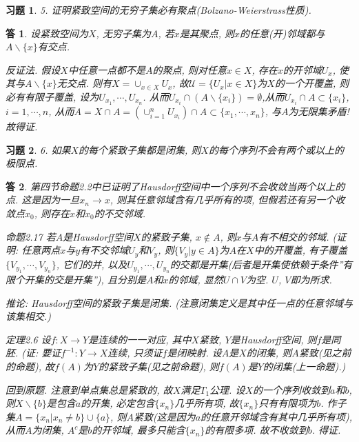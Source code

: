 \documentclass{ctexart}%
\newtheorem*{exercise}{习题}
\newtheorem*{solution}{答}
\theoremstyle{definition}
\theoremstyle{remark}
\begin{document}
\begin{exercise}5. 证明紧致空间的无穷子集必有聚点(Bolzano-Weierstrass性质). 
\end{exercise}
\begin{solution}
设紧致空间为$X$, 无穷子集为$A$, 若$x$是其聚点, 则$x$的任意(开)邻域都与$A\backslash\{x\}$有交点. 

反证法. 假设$X$中任意一点都不是$A$的聚点, 则对任意$x\in X$, 存在$x$的开邻域$U_x$, 使其与$A\backslash\{x\}$无交点. 则有$X=\cup_{x\in X}U_x$, 故$\mathscr{U}=\{U_x|x\in X\}$为$X$的一个开覆盖, 则必有有限子覆盖, 设为$U_{x_1},\cdots, U_{x_n}$. 从而$U_{x_i}\cap( A\backslash\{x_i\})=\emptyset$,从而$U_{x_i}\cap A\subset \{x_i\}$, $i=1,\cdots, n$, 从而$A=X\cap A=(\cup_{i=1}^n  U_{x_i})\cap A\subset
\{x_1,\cdots, x_n\}$, 与$A$为无限集矛盾! 故得证.
\end{solution}

\begin{exercise}6. 如果$X$的每个紧致子集都是闭集, 则$X$的每个序列不会有两个或以上的极限点.
\end{exercise}
\begin{solution}
第四节命题2.2中已证明了Hausdorff空间中一个序列不会收敛当两个以上的点. 这是因为一旦$x_n\rightarrow x$, 则其任意邻域含有几乎所有的项, 但假若还有另一个收敛点$x_0$, 则存在$x$和$x_0$的不交邻域. 

命题2.17 若$A$是Hausdorff空间$X$的紧致子集, $x\notin A$, 则$x$与$A$有不相交的邻域. (证明: 任意两点$x$与$y$有不交邻域$U_y$和$V_y$, 则$\{V_y|y\in A\}$为$A$在$X$中的开覆盖, 有子覆盖$\{V_{y_1},\cdots, V_{y_n}\}$, 它们的并, 以及$U_{y_1},\cdots, U_{y_n}$的交都是开集(后者是开集使依赖于条件''有限个开集的交是开集''), 且分别是$A$和$x$的邻域, 显然$U\cap V$为空. $U$, $V$即为所求. 

推论: Hausdorff空间的紧致子集是闭集. (注意闭集定义是其中任一点的任意邻域与该集相交.)

定理2.6 设$f:X\rightarrow Y$是连续的一一对应, 其中$X$紧致, $Y$是Hausdorff空间, 则$f$是同胚. (证: 要证$f^{-1}: Y\rightarrow X$连续, 只须证$f$是闭映射. 设$A$是$X$的闭集, 则$A$紧致(见之前的命题), 故$f(A)$为$Y$的紧致子集(见之前命题), 则$f(A)$是$Y$的闭集(上一命题).)

回到原题. 注意到单点集总是紧致的, 故$X$满足$T_1$公理. 设$X$的一个序列收敛到$a$和$b$, 则$X\backslash \{b\}$是包含$a$的开集, 必定包含$\{x_n\}$几乎所有项, 故$\{x_n\}$只有有限项为$b$. 作子集$A=\{x_n|x_n\neq b\}\cup\{a\}$, 则$A$紧致(这是因为$a$的任意开邻域含有其中几乎所有项), 从而$A$为闭集, $A^c$是$b$的开邻域, 最多只能含$\{x_n\}$的有限多项. 故不收敛到$b$. 得证.
\end{solution}
\end{document}
